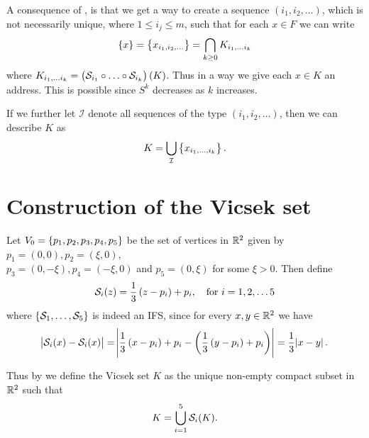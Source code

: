 \clearpage
\begin{remark}
	A consequence of , is that we get a way to create a sequence $(i_1, i_2, \ldots)$, which is not necessarily unique, where $1 \leq i_j \leq m$, such that for each $x \in F$ we can write
	\begin{equation}\label{pointAsIntersectSet}
		\cbr{x} = \cbr{x_{i_1, i_2, \ldots}} = \bigcap_{k \geq 0} K_{i_1, \ldots i_k}
	\end{equation}
	where $K_{i_1, \ldots i_k} = \left(\mathcal{S}_{i_1} \circ \ldots \circ \mathcal{S}_{i_k}\right)(K)$. Thus in a way we give each $x \in K$ an address. This is possible since $S^{k}$ decreases as $k$ increases. 
	
	If we further let $\mathcal{I}$ denote all sequences of the type $(i_1, i_2, \ldots)$, then we can describe $K$ as
	\begin{equation}\label{InvSetAsPoint}
		K = \bigcup_{\mathcal{I}} \cbr{x_{i_1, \ldots, i_k}}.
	\end{equation}
\end{remark}

\section{Construction of the Vicsek set}\label{sec:constructVicsek}

Let $V_0 = \cbr{ p_1, p_2, p_3, p_4, p_5}$ be the set of vertices  in $\mathbb{R}^{2}$ given by $p_1 = (0,0), p_2=(\xi, 0),$ \\ $p_3 = (0, -\xi), p_4 = (-\xi, 0)$ and $p_5 = (0, \xi)$ for some $\xi > 0$. Then define
\begin{equation}
	\mathcal{S}_i(z) = \frac{1}{3} \left(z - p_i\right) +p_i, \quad \text{for } i = 1,2,\ldots 5
\end{equation}
where $\cbr{\fracConst_{1}, \ldots, \fracConst_{5}}$ is indeed an IFS, since for every $x, y \in \mathbb{R}^2$ we have
\begin{equation}
	\abs{\mathcal{S}_{i}(x)-\mathcal{S}_{i}(x)} = \abs{\frac{1}{3} \left(x - p_i\right) +p_i - \left(\frac{1}{3} \left(y - p_i\right) +p_i\right)} =\frac{1}{3}\abs{x-y}.
\end{equation}

Thus by  we define the Vicsek set $K$ as the unique non-empty compact subset in $\mathbb{R}^{2}$ such that
\begin{equation}
	K = \bigcup_{i = 1}^{5} \mathcal{S}_i(K).
\end{equation}

